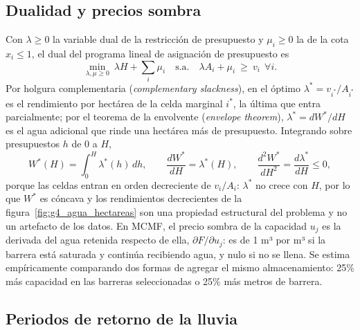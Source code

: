 \subsection{Dualidad y precios sombra}\label{sec:duales}

Con $\lambda\ge0$ la variable dual de la restricción de presupuesto y $\mu_i\ge0$ la de la cota $x_i\le1$, el dual del programa lineal de asignación de presupuesto es
\begin{equation}
\min_{\lambda,\mu\ge0}\ \lambda H+\sum_i\mu_i \quad\text{s.a.}\quad \lambda A_i+\mu_i\ \ge\ v_i\ \ \forall i .
\end{equation}
Por holgura complementaria (\emph{complementary slackness}), en el óptimo $\lambda^\ast = v_{i^\ast}/A_{i^\ast}$ es el rendimiento por hectárea de la celda marginal $i^\ast$, la última que entra parcialmente; por el teorema de la envolvente (\emph{envelope theorem}), $\lambda^\ast = dW^\ast/dH$ es el agua adicional que rinde una hectárea más de presupuesto. Integrando sobre presupuestos $h$ de 0 a $H$,
\begin{equation}
W^\ast(H)=\int_0^H \lambda^\ast(h)\,dh,\qquad \frac{dW^\ast}{dH}=\lambda^\ast(H),\qquad \frac{d^2W^\ast}{dH^2}=\frac{d\lambda^\ast}{dH}\le 0 ,
\end{equation}
porque las celdas entran en orden decreciente de $v_i/A_i$: $\lambda^\ast$ no crece con $H$, por lo que $W^\ast$ es cóncava y los rendimientos decrecientes de la figura~\ref{fig:g4_agua_hectareas} son una propiedad estructural del problema y no un artefacto de los datos. En MCMF, el precio sombra de la capacidad $u_j$ es la derivada del agua retenida respecto de ella, $\partial F/\partial u_j$: es de 1 m³ por m³ si la barrera está saturada y continúa recibiendo agua, y nulo si no se llena. Se estima empíricamente comparando dos formas de agregar el mismo almacenamiento: 25\% más capacidad en las barreras seleccionadas o 25\% más metros de barrera.

\subsection{Periodos de retorno de la lluvia}\label{sec:gumbel}

